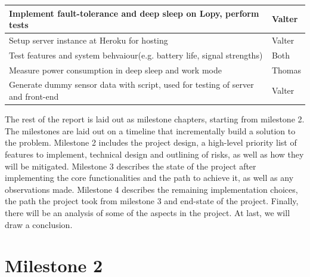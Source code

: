 \begin{longtable}{ | p{10cm} | p{1.3cm}|}
			Implement fault-tolerance and deep sleep on Lopy, perform tests & Valter\\ \hline
			Setup server instance at Heroku for hosting & Valter\\ \hline
			Test features and system behvaiour(e.g. battery life, signal strengths) & Both\\ \hline
			Measure power consumption in deep sleep and work mode & Thomas\\ \hline
			Generate dummy sensor data with script, used for testing of server and front-end & Valter\\ \hline
		\end{longtable}
		The rest of the report is laid out as milestone chapters, starting from milestone 2. The milestones are laid out on a timeline that incrementally build a solution to the problem. Milestone 2 includes the project design, a high-level priority list of features to implement, technical design and outlining of risks, as well as how they will be mitigated. Milestone 3 describes the state of the project after implementing the core functionalities and the path to achieve it, as well as any observations made. Milestone 4 describes the remaining implementation choices, the path the project took from milestone 3 and end-state of the project. Finally, there will be an analysis of some of the aspects in the project. At last, we will draw a conclusion. 		
		

\section{Milestone 2}
